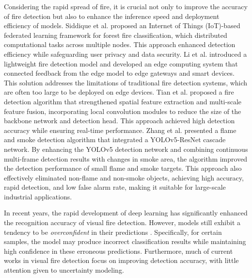 Considering the rapid spread of fire, it is crucial not only to improve the accuracy of fire detection but also to enhance the inference speed and deployment efficiency of models. Siddique et al. \cite{13siddique2024} proposed an Internet of Things (IoT)-based federated learning framework for forest fire classification, which distributed computational tasks across multiple nodes. This approach enhanced detection efficiency while safeguarding user privacy and data security. Li et al. \cite{14li2023} introduced a lightweight fire detection model and developed an edge computing system that connected feedback from the edge model to edge gateways and smart devices. This solution addresses the limitations of traditional fire detection systems, which are often too large to be deployed on edge devices. Tian et al. \cite{15tian2024} proposed a fire detection algorithm that strengthened spatial feature extraction and multi-scale feature fusion, incorporating local convolution modules to reduce the size of the backbone network and detection head. This approach achieved high detection accuracy while ensuring real-time performance. Zhang et al. \cite{16zhang2023} presented a flame and smoke detection algorithm that integrated a YOLOv5-ResNet cascade network. By enhancing the YOLOv5 detection network and combining continuous multi-frame detection results with changes in smoke area, the algorithm improved the detection performance of small flame and smoke targets. This approach also effectively eliminated non-flame and non-smoke objects, achieving high accuracy, rapid detection, and low false alarm rate, making it suitable for large-scale industrial applications.

In recent years, the rapid development of deep learning has significantly enhanced the recognition accuracy of visual fire detection. However, models still exhibit a tendency to be \textit{overconfident} in their predictions \cite{17guo2017}. Specifically, for certain samples, the model may produce incorrect classification results while maintaining high confidence in these erroneous predictions. Furthermore, much of current works in visual fire detection focus on improving detection accuracy, with little attention given to uncertainty modeling.

